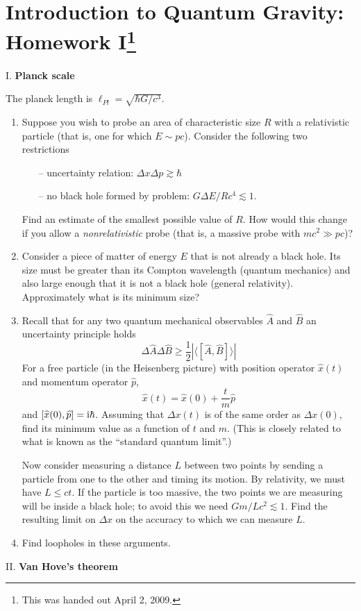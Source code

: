 \section[Homework I]{Introduction to Quantum Gravity: Homework I\footnote{This was handed out April 2, 2009.}}


I. \textbf{Planck scale}

The planck length is $\ell_{Pl} = \sqrt{\hbar G/c^{3}}$.
\begin{enumerate}[label=(\alph*),nosep]
\item Suppose you wish to probe an area of characteristic size $R$ with
  a relativistic particle (that is, one for which $E\sim pc$). Consider
  the following two restrictions
  \begin{itemize}
  \item[--] uncertainty relation: $\Delta x\Delta p\gtrsim\hbar$
  \item[--] no black hole formed by problem: $G\Delta E/R c^{4}\lesssim 1$.
  \end{itemize}
  Find an estimate of the smallest possible value of $R$. How would this
  change if you allow a \emph{nonrelativistic} probe (that is, a massive
  probe with $mc^{2}\gg pc$)?
\item Consider a piece of matter of energy $E$ that is not already a
  black hole. Its size must be greater than its Compton wavelength
  (quantum mechanics) and also large enough that it is not a black hole
  (general relativity). Approximately what is its minimum size?
\item Recall that for any two quantum mechanical observables
  $\widehat{A}$ and $\widehat{B}$ an uncertainty principle holds
  \begin{equation*}
\Delta\widehat{A}\Delta\widehat{B}\geq\frac{1}{2}|\langle[\widehat{A},\widehat{B}]\rangle|
  \end{equation*}
  For a free particle (in the Heisenberg picture) with position operator
  $\widehat{x}(t)$ and momentum operator $\widehat{p}$,
  \begin{equation*}
    \widehat{x}(t) = \widehat{x}(0) + \frac{t}{m}\widehat{p}
  \end{equation*}
  and $[\widehat{x}(0),\widehat{p}]=\mathrm{i}\hbar$. Assuming that $\Delta x(t)$
  is of the same order as $\Delta x(0)$, find its minimum value as a
  function of $t$ and $m$. (This is closely related to what is known as
  the ``standard quantum limit''.)

  Now consider measuring a distance $L$ between two points by sending a
  particle from one to the other and timing its motion. By relativity,
  we must have $L\leq ct$. If the particle is too massive, the two
  points we are measuring will be inside a black hole; to avoid this we
  need $Gm/Lc^{2}\lesssim1$. Find the resulting limit on $\Delta x$
  on the accuracy to which we can measure $L$.
\item Find loopholes in these arguments.
\end{enumerate}
\medbreak\noindent{}II. \textbf{Van Hove's theorem}\medbreak

